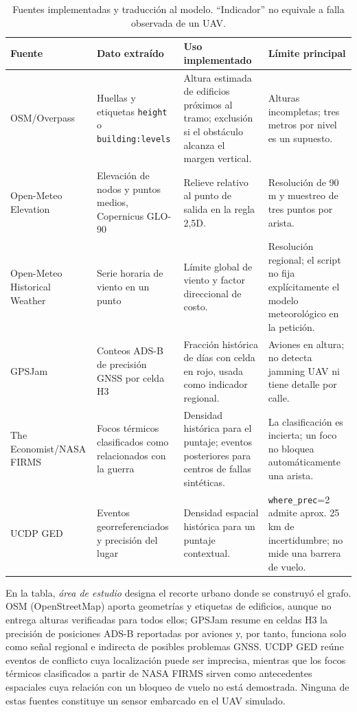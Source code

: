 \documentclass[journal,10pt]{IEEEtran}
\begin{document}
\begin{table}[!t]
\centering
\caption{Fuentes implementadas y traducción al modelo. ``Indicador'' no equivale a falla observada de un UAV.}
\label{tab:fuentes}
\footnotesize
\begin{tabularx}{\textwidth}{@{}>{\raggedright\arraybackslash}p{2.3cm}>{\raggedright\arraybackslash}p{3.2cm}>{\raggedright\arraybackslash}X>{\raggedright\arraybackslash}p{3.2cm}@{}}
\toprule
\textbf{Fuente} & \textbf{Dato extraído} & \textbf{Uso implementado} & \textbf{Límite principal} \\
\midrule
OSM/Overpass \cite{osm} & Huellas y etiquetas \texttt{height} o \texttt{building:levels} & Altura estimada de edificios próximos al tramo; exclusión si el obstáculo alcanza el margen vertical. & Alturas incompletas; tres metros por nivel es un supuesto. \\
Open-Meteo Elevation \cite{elev} & Elevación de nodos y puntos medios, Copernicus GLO-90 & Relieve relativo al punto de salida en la regla 2,5D. & Resolución de 90 m y muestreo de tres puntos por arista. \\
Open-Meteo Historical Weather \cite{meteo} & Serie horaria de viento en un punto & Límite global de viento y factor direccional de costo. & Resolución regional; el script no fija explícitamente el modelo meteorológico en la petición. \\
GPSJam \cite{gpsjam} & Conteos ADS-B de precisión GNSS por celda H3 & Fracción histórica de días con celda en rojo, usada como indicador regional. & Aviones en altura; no detecta jamming UAV ni tiene detalle por calle. \\
The Economist/NASA FIRMS \cite{warfire} & Focos térmicos clasificados como relacionados con la guerra & Densidad histórica para el puntaje; eventos posteriores para centros de fallas sintéticas. & La clasificación es incierta; un foco no bloquea automáticamente una arista. \\
UCDP GED \cite{ucdp} & Eventos georreferenciados y precisión del lugar & Densidad espacial histórica para un puntaje contextual. & \texttt{where\_prec}=2 admite aprox. 25 km de incertidumbre; no mide una barrera de vuelo. \\
\bottomrule
\end{tabularx}
\end{table}

En la tabla, \emph{área de estudio} designa el recorte urbano donde se
construyó el grafo. OSM (OpenStreetMap) aporta geometrías y etiquetas de
edificios, aunque no entrega alturas verificadas para todos ellos;
GPSJam resume en celdas H3 la precisión de posiciones ADS-B reportadas por
aviones y, por tanto, funciona solo como señal regional e indirecta de
posibles problemas GNSS. UCDP GED reúne eventos de conflicto cuya
localización puede ser imprecisa, mientras que los focos térmicos
clasificados a partir de NASA FIRMS sirven como antecedentes espaciales
cuya relación con un bloqueo de vuelo no está demostrada. Ninguna de
estas fuentes constituye un sensor embarcado en el UAV simulado.
\end{document}
